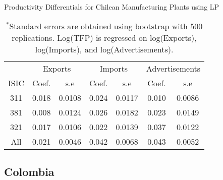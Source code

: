 \documentclass[12pt]{article}
\begin{document}
\begin{appendices}
\begin{table}[H]
\centering
\caption{Productivity Differentials for Chilean Manufacturing Plants using LP}
\small
\begin{tabular}{ccccccc}
  \hline\hline & \multicolumn{2}{c}{Exports}  & \multicolumn{2}{c}{Imports} & \multicolumn{2}{c}{Advertisements} \\ \cmidrule(lr){2-3} \cmidrule(lr){4-5} \cmidrule(lr){6-7}ISIC & Coef. & s.e & Coef. & s.e & Coef. & s.e \\ 
  \hline
311 & 0.018 & 0.0108 & 0.024 & 0.0117 & 0.010 & 0.0086 \\ 
  381 & 0.008 & 0.0124 & 0.026 & 0.0182 & 0.023 & 0.0149 \\ 
  321 & 0.017 & 0.0106 & 0.022 & 0.0139 & 0.037 & 0.0122 \\ 
  All & 0.021 & 0.0046 & 0.042 & 0.0068 & 0.043 & 0.0052 \\ 
   \hline
\end{tabular}
\caption*{\footnotesize $^{*}$Standard errors are obtained using bootstrap with 500 replications. Log(TFP) is regressed on log(Exports), log(Imports), and log(Advertisements).}
\label{LPCHLTFPP}
\end{table}

\subsection{Colombia}


\end{appendices}
\end{document}
